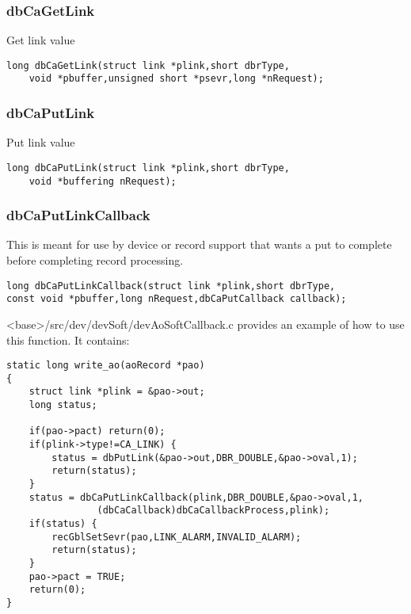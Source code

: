 \subsubsection{dbCaGetLink}

Get link value

\begin{verbatim}
long dbCaGetLink(struct link *plink,short dbrType,
    void *pbuffer,unsigned short *psevr,long *nRequest);
\end{verbatim}

\subsubsection{dbCaPutLink}

Put link value

\begin{verbatim}
long dbCaPutLink(struct link *plink,short dbrType,
    void *buffering nRequest);
\end{verbatim}

\subsubsection{dbCaPutLinkCallback}

This is meant for use by device or record support that wants a put to complete before completing record processing.

\begin{verbatim}
long dbCaPutLinkCallback(struct link *plink,short dbrType,
const void *pbuffer,long nRequest,dbCaPutCallback callback);
\end{verbatim}

\textless{}base\textgreater{}/src/dev/devSoft/devAoSoftCallback.c provides an example of how to use this function. It contains:

\begin{verbatim}
static long write_ao(aoRecord *pao)
{
    struct link *plink = &pao->out;
    long status;

    if(pao->pact) return(0);
    if(plink->type!=CA_LINK) {
        status = dbPutLink(&pao->out,DBR_DOUBLE,&pao->oval,1);
        return(status);
    }
    status = dbCaPutLinkCallback(plink,DBR_DOUBLE,&pao->oval,1,
                (dbCaCallback)dbCaCallbackProcess,plink);
    if(status) {
        recGblSetSevr(pao,LINK_ALARM,INVALID_ALARM);
        return(status);
    }
    pao->pact = TRUE;
    return(0);
}
\end{verbatim}

